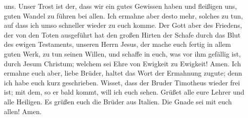 uns. Unser Trost ist der, dass wir ein gutes Gewissen haben und
fleißigen uns, guten Wandel zu führen bei allen.  Ich
ermahne aber desto mehr, solches zu tun, auf dass ich umso schneller
wieder zu euch komme.  Der Gott aber des Friedens, der von
den Toten ausgeführt hat den großen Hirten der Schafe durch das Blut des
ewigen Testaments, unseren Herrn Jesus,  der mache euch
fertig in allem guten Werk, zu tun seinen Willen, und schaffe in euch,
was vor ihm gefällig ist, durch Jesum Christum; welchem sei Ehre von
Ewigkeit zu Ewigkeit! Amen.  Ich ermahne euch aber, liebe
Brüder, haltet das Wort der Ermahnung zugute; denn ich habe euch kurz
geschrieben.  Wisset, dass der Bruder Timotheus wieder frei
ist; mit dem, so er bald kommt, will ich euch sehen. 
Grüßet alle eure Lehrer und alle Heiligen. Es grüßen euch die Brüder aus
Italien.  Die Gnade sei mit euch allen! Amen.

